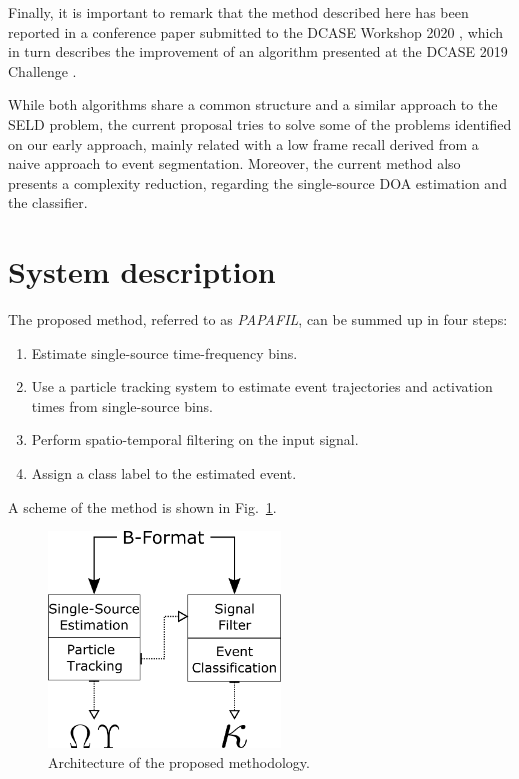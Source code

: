 Finally, it is important to remark that the method described here has been reported in a conference paper submitted to the DCASE Workshop 2020 \cite{papafil},  which in turn describes the improvement of an algorithm presented at the DCASE 2019 Challenge \cite{perez2019hybrid}.
 
While both algorithms share a common structure and a similar approach to the SELD problem, the current proposal tries to solve some of the problems identified on our early approach, mainly related with a low frame recall derived from a naive approach to event segmentation. Moreover, the current method also presents a complexity reduction, regarding the single-source DOA estimation and the classifier. 


\newpage
\section{System description}
\label{sec:methodology}

The proposed method, referred to as \textit{PAPAFIL}, can be summed up in four steps:

\begin{enumerate}
    \item Estimate single-source time-frequency bins.
    \item Use a particle tracking system to estimate event trajectories and activation times from single-source bins.
    \item Perform spatio-temporal filtering on the input signal.
    \item Assign a class label to the estimated event.
\end{enumerate}

A scheme of the method is shown in Fig.~\ref{fig:scheme}.

\begin{figure}[th!]
  \centering
  \centerline{\includegraphics[width=0.55\textwidth]{Figures/SELD/ARCH.png}}
  \caption{Architecture of the proposed methodology.}
  \label{fig:scheme}
\end{figure}


